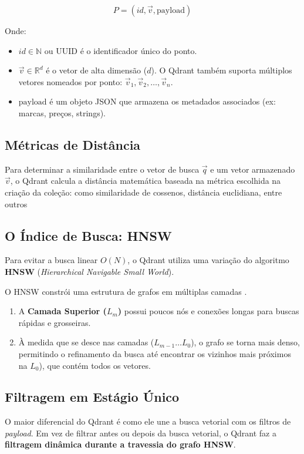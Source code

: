 \documentclass[a4paper, 12pt]{article} %
\begin{document}
\begin{equation}
P = \left( id, \vec{v}, \text{payload} \right)
\end{equation}

Onde:
\begin{itemize}
    \item $id \in \mathbb{N}$ ou $\text{UUID}$ é o identificador único do ponto.
    \item $\vec{v} \in \mathbb{R}^d$ é o vetor de alta dimensão ($d$). O Qdrant também suporta múltiplos vetores nomeados por ponto: $\vec{v}_1, \vec{v}_2, \dots, \vec{v}_n$.
    \item $\text{payload}$ é um objeto JSON que armazena os metadados associados (ex: marcas, preços, strings).
\end{itemize}

\subsection{Métricas de Distância}
Para determinar a similaridade entre o vetor de busca $\vec{q}$ e um vetor armazenado $\vec{v}$, o Qdrant calcula a distância matemática baseada na métrica escolhida na criação da coleção: como similaridade de cossenos, distância euclidiana, entre outros


\subsection{O Índice de Busca: HNSW}
Para evitar a busca linear $O(N)$, o Qdrant utiliza uma variação do algoritmo \textbf{HNSW} (\textit{Hierarchical Navigable Small World}). 

O HNSW constrói uma estrutura de grafos em múltiplas camadas . 
\begin{enumerate}
    \item A \textbf{Camada Superior ($L_m$)} possui poucos nós e conexões longas para buscas rápidas e grosseiras.
    \item À medida que se desce nas camadas ($L_{m-1} \dots L_0$), o grafo se torna mais denso, permitindo o refinamento da busca até encontrar os vizinhos mais próximos na $L_0$), que contém todos os vetores.
\end{enumerate}

\subsection{Filtragem em Estágio Único}
O maior diferencial do Qdrant é como ele une a busca vetorial com os filtros de \textit{payload}. Em vez de filtrar antes ou depois da busca vetorial, o Qdrant faz a \textbf{filtragem dinâmica durante a travessia do grafo HNSW}.
\end{document}
